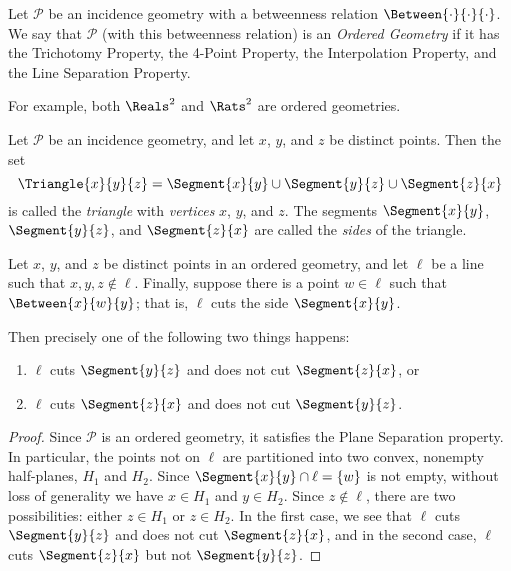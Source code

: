 \documentclass{article}
\begin{document}
\begin{dfn}
Let $\mathcal{P}$ be an incidence geometry with a betweenness relation $\Between{\cdot}{\cdot}{\cdot}$. We say that $\mathcal{P}$ (with this betweenness relation) is an \emph{Ordered Geometry} if it has the Trichotomy Property, the 4-Point Property, the Interpolation Property, and the Line Separation Property.
\end{dfn}

For example, both $\Reals^2$ and $\Rats^2$ are ordered geometries.

\begin{dfn}[Triangle]
Let $\mathcal{P}$ be an incidence geometry, and let $x$, $y$, and $z$ be distinct points. Then the set \[ \Triangle{x}{y}{z} = \Segment{x}{y} \cup \Segment{y}{z} \cup \Segment{z}{x} \] is called the \emph{triangle} with \emph{vertices} $x$, $y$, and $z$. The segments $\Segment{x}{y}$, $\Segment{y}{z}$, and $\Segment{z}{x}$ are called the \emph{sides} of the triangle.
\end{dfn}

\begin{thm}
Let $x$, $y$, and $z$ be distinct points in an ordered geometry, and let $\ell$ be a line such that $x,y,z \notin \ell$. Finally, suppose there is a point $w \in \ell$ such that $\Between{x}{w}{y}$; that is, $\ell$ cuts the side $\Segment{x}{y}$.

Then precisely one of the following two things happens:
\begin{enumerate}
\item $\ell$ cuts $\Segment{y}{z}$ and does not cut $\Segment{z}{x}$, or
\item $\ell$ cuts $\Segment{z}{x}$ and does not cut $\Segment{y}{z}$.
\end{enumerate}
\end{thm}

\begin{proof}
Since $\mathcal{P}$ is an ordered geometry, it satisfies the Plane Separation property. In particular, the points not on $\ell$ are partitioned into two convex, nonempty half-planes, $H_1$ and $H_2$. Since $\Segment{x}{y} \cap \ell = \{w\}$ is not empty, without loss of generality we have $x \in H_1$ and $y \in H_2$. Since $z \notin \ell$, there are two possibilities: either $z \in H_1$ or $z \in H_2$. In the first case, we see that $\ell$ cuts $\Segment{y}{z}$ and does not cut $\Segment{z}{x}$, and in the second case, $\ell$ cuts $\Segment{z}{x}$ but not $\Segment{y}{z}$.
\end{proof}
\end{document}

